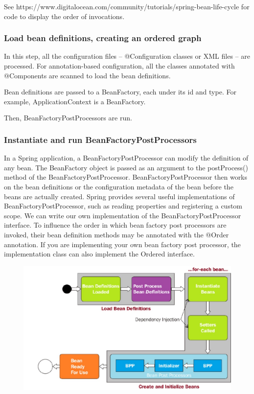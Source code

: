 \documentclass{scrartcl}
\begin{document}
See https://www.digitalocean.com/community/tutorials/spring-bean-life-cycle for code to display the order of invocations.

\subsubsection{Load bean definitions, creating an ordered graph}
In this step, all the configuration files – @Configuration classes or XML files – are processed. For annotation-based configuration, all the classes annotated with @Components are scanned to load the bean definitions.

Bean definitions are passed to a BeanFactory, each under its id and type. For example, ApplicationContext is a BeanFactory.

Then, BeanFactoryPostProcessors are run.

\subsubsection{Instantiate and run BeanFactoryPostProcessors}
In a Spring application, a BeanFactoryPostProcessor can modify the definition of any bean.
The BeanFactory object is passed as an argument to the postProcess() method of the BeanFactoryPostProcessor. BeanFactoryPostProcessor then works on the bean definitions or the configuration metadata of the bean before the beans are actually created.
Spring provides several useful implementations of BeanFactoryPostProcessor, such as reading properties and registering a custom scope. We can write our own implementation of the BeanFactoryPostProcessor interface. To influence the order in which bean factory post processors are invoked, their bean definition methods may be annotated with the @Order annotation. If you are implementing your own bean factory post processor, the implementation class can also implement the Ordered interface.

\begin{figure}
    \centering
    \includegraphics[width=1\linewidth]{bean-lifecycle-3}
    \caption{}
    \label{fig:bean-lifecycle-1}
\end{figure}
\end{document}
